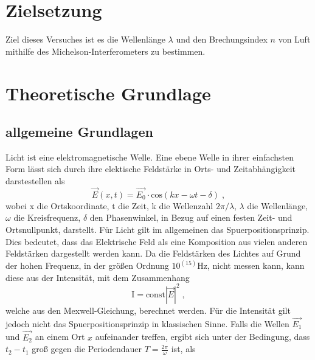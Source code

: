 \section{Zielsetzung}
    Ziel dieses Versuches ist es die Wellenlänge $\lambda$ und den Brechungsindex $n$ von Luft mithilfe des Michelson-Interferometers zu bestimmen.

\section{Theoretische Grundlage}
\noindent
\subsection{allgemeine Grundlagen}
Licht ist eine elektromagnetische Welle. Eine ebene Welle in ihrer einfachsten Form lässt sich durch ihre elektische Feldstärke in Orts- und Zeitabhängigkeit darstestellen als
\begin{equation}
    \vec{E}(x, t) = \vec{E_0} \cdot \text{cos}(kx - \omega t - \delta) \; , 
    \label{eqn:ansatz}
\end{equation}
\noindent
wobei x die Ortskoordinate, t die Zeit, k die Wellenzahl $2 \pi/\lambda$, $\lambda$ die Wellenlänge, $\omega$ die Kreisfrequenz, $\delta$ den Phasenwinkel, in Bezug auf einen festen Zeit- und Ortsnullpunkt, darstellt. Für Licht gilt im allgemeinen das Spuerpositionsprinzip. Dies bedeutet, dass das Elektrische Feld als eine Komposition aus vielen anderen Feldstärken dargestellt werden kann.
Da die Feldstärken des Lichtes auf Grund der hohen Frequenz, in der größen Ordnung $10^(15) \si{\hertz}$, nicht messen kann, kann diese aus der Intensität, mit dem Zusammenhang
\begin{equation*}
    \text{I} = \text{const} |\vec{E}|^2 \; ,
    \label{eqn:Int}
\end{equation*}
\noindent
welche aus den Mexwell-Gleichung, berechnet werden. Für die Intensität gilt jedoch nicht das Spuerpositionsprinzip in klassischen Sinne. Falls die Wellen $\vec{E_1}$ und $\vec{E_2}$ 
an einem Ort $x$  aufeinander treffen, ergibt sich unter der Bedingung, dass $t_2 - t_1$ groß gegen die Periodendauer $T = \frac{2 \pi}{\omega}$ ist, als

